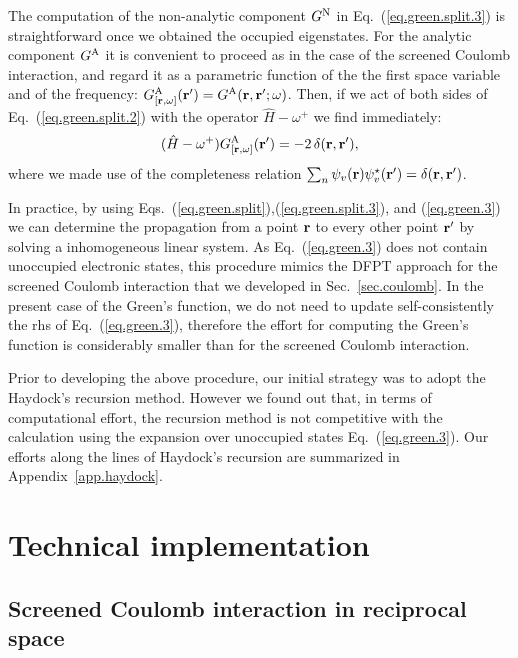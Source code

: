 \documentclass[twocolumn,prb,showpacs,superscriptaddress]{revtex4}
\def\w{\omega}
\def\H{\hat{H}}
\def\r{{\bf r}}
\def\rp{{\bf r^\prime}}
\begin{document}
The computation of the non-analytic component $G^{\rm N}$ in Eq.\ (\ref{eq.green.split.3})
is straightforward once we obtained the occupied eigenstates.
For the analytic component $G^{\rm A}$ it is convenient to
proceed as in the case of the screened Coulomb interaction,
and regard it as a parametric
function of the the first space variable
and of the frequency: $G^{\rm A}_{[\r,\w]}(\rp) = G^{\rm A}(\r,\rp;\w)$.
Then, if we act of both sides of Eq.\ (\ref{eq.green.split.2})
with the operator $\H-\w^+$ we find immediately:
  \begin{equation}\label{eq.green.3}
  (\H-\w^+) G^{\rm A}_{[\r,\w]}(\rp) = -2\, \delta(\r,\rp), 
  \end{equation}
where we made use of the 
completeness relation $\sum_n \psi_v(\r)\psi_v^\star(\rp) = \delta(\r,\rp)$.

In practice, by using Eqs.\ (\ref{eq.green.split}),(\ref{eq.green.split.3}), and
(\ref{eq.green.3}) we can determine the propagation
from a point $\r$ to every other point $\rp$ by solving a inhomogeneous
linear system. As Eq.\ (\ref{eq.green.3}) does not contain unoccupied
electronic states, this procedure mimics the DFPT approach for the
screened Coulomb interaction that we developed in Sec.\ \ref{sec.coulomb}.
In the present case of the Green's function, we do not need to update
self-consistently the rhs of Eq.\ (\ref{eq.green.3}), therefore the
effort for computing the Green's function is considerably smaller
than for the screened Coulomb interaction.

Prior to developing the above procedure, our initial strategy was to adopt 
the Haydock's recursion method.\cite{haydock1}
However we found out that, in terms of computational effort,
the recursion method is not competitive with the calculation using
the expansion over unoccupied states Eq.\ (\ref{eq.green.3}).
Our efforts along the lines of Haydock's recursion are summarized in
Appendix~\ref{app.haydock}.


\section{Technical implementation}

\subsection{Screened Coulomb interaction in reciprocal space}
\end{document}

